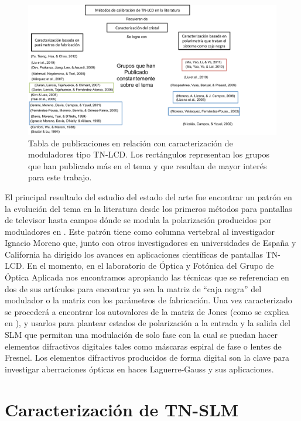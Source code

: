 \begin{figure}[h!]
\centering
\includegraphics[scale=.5]{articulos_metodos}
\caption[Publicaciones en relación a la caracterización de TN-LCD]{Tabla de publicaciones en relación con caracterización de
  moduladores tipo TN-LCD. Los rectángulos representan los grupos que
  han publicado más en el tema y que resultan de mayor interés para
  este trabajo. }
\label{fig:articulos_metodos}
\end{figure}

El principal resultado del estudio del estado del arte fue encontrar
un patrón en la evolución del tema en la literatura desde los primeros
métodos para pantallas de televisor  hasta campos
dónde se modula la polarización producidos por moduladores en
. Este patrón tiene como columna vertebral al
investigador Ignacio Moreno que, junto con otros investigadores en
universidades de España y California ha dirigido los avances en aplicaciones
científicas de pantallas TN-LCD. En el momento, en el laboratorio de
Óptica y Fotónica del Grupo de Óptica Aplicada nos encontramos
apropiando las técnicas que se referencian en dos de sus artículos
para encontrar ya sea la matriz de ``caja negra'' del modulador o la
matriz con los parámetros de fabricación. Una vez caracterizado se
procederá a encontrar los autovalores de la matriz de Jones (como se
explica en ), y usarlos
para plantear estados de polarización a la entrada y la salida del SLM
que permitan una modulación de solo fase con la cual se puedan hacer
elementos difractivos digitales tales como máscaras espiral de fase o
lentes de Fresnel. Los elementos difractivos producidos de forma
digital son la clave para investigar aberraciones ópticas en haces
Laguerre-Gauss y sus aplicaciones.

\section{Caracterización de TN-SLM}
\label{sec:ChPD_Caracterizacion_de_SLM}

